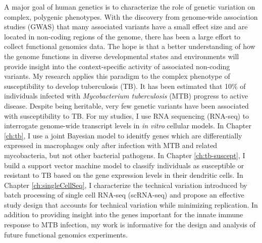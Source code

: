 \abstract
A major goal of human genetics is to characterize the role of genetic
variation on complex, polygenic phenotypes. With the discovery from
genome-wide association studies (GWAS) that many associated variants
have a small effect size and are located in non-coding regions of the
genome, there has been a large effort to collect functional genomics
data. The hope is that a better understanding of how the genome
functions in diverse developmental states and environments will
provide insight into the context-specific activity of associated
non-coding variants. My research applies this paradigm to the complex
phenotype of susceptibility to develop tuberculosis (TB). It has been
estimated that 10\% of individuals infected with \emph{Mycobacterium
tuberculosis} (MTB) progress to active disease. Despite being
heritable, very few genetic variants have been associated with
susceptibility to TB. For my studies, I use RNA sequencing (RNA-seq)
to interrogate genome-wide transcript levels in \emph{in vitro}
cellular models. In Chapter \ref{ch:tb}, I use a joint Bayesian model
to idenitfy genes which are differentially expressed in macrophages
only after infection with MTB and related mycobacteria, but not other
bacterial pathogens. In Chapter \ref{ch:tb-suscept}, I build a support
vector machine model to classify individuals as susceptible or
resistant to TB based on the gene expression levels in their dendritic
cells. In Chapter \ref{ch:singleCellSeq}, I characterize the technical
variation introduced by batch processing of single cell RNA-seq
(scRNA-seq) and propose an effective study design that accounts for
technical variation while minimizing replication.  In addition to
providing insight into the genes important for the innate immune
response to MTB infection, my work is informative for the design and
analysis of future functional genomics experiments.
